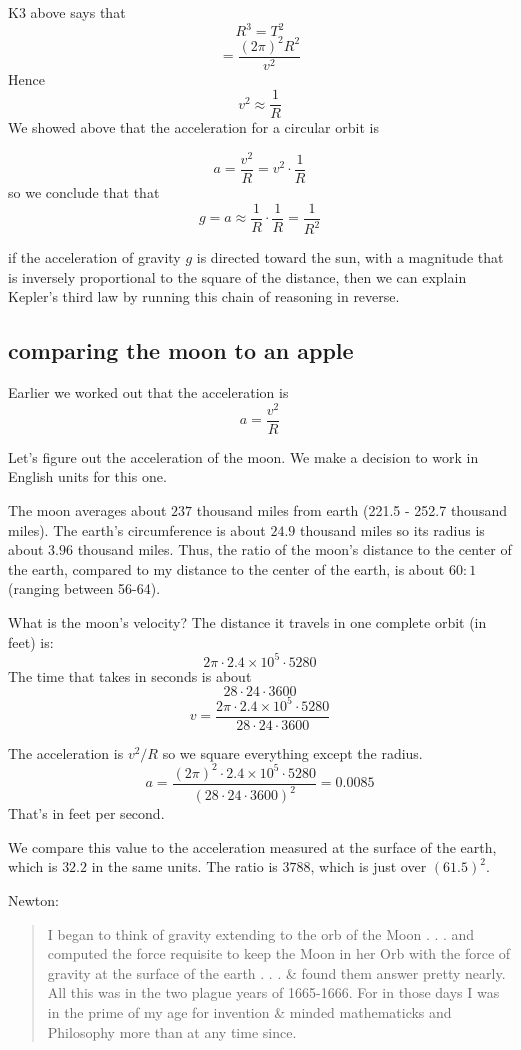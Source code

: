 \documentclass[11pt, oneside]{article}
\begin{document}
K3 above says that
\[ R^3 = T^2 \]
\[ = \frac{(2 \pi)^2 R^2}{v^2}  \]
Hence
\[ v^2 \approx \frac{1}{R} \]
We showed above that the acceleration for a circular orbit is

\[ a = \frac{v^2}{R} = v^2 \cdot \frac{1}{R}  \]
so we conclude that that
\[ g = a \approx \frac{1}{R} \cdot \frac{1}{R} = \frac{1}{R^2}  \] 

if the acceleration of gravity $g$ is directed toward the sun, with a magnitude that is inversely proportional to the square of the distance, then we can explain Kepler's third law by running this chain of reasoning in reverse.

\subsection*{comparing the moon to an apple}
Earlier we worked out that the acceleration is
\[ a = \frac{v^2}{R} \]

Let's figure out the acceleration of the moon.  We make a decision to work in English units for this one.  

The moon averages about $237$ thousand miles from earth (221.5 - 252.7 thousand miles).  The earth's circumference is about $24.9$ thousand miles so its radius is about $3.96$ thousand miles.  Thus, the ratio of the moon's distance to the center of the earth, compared to my distance to the center of the earth, is about $60:1$ (ranging between 56-64).

What is the moon's velocity?  The distance it travels in one complete orbit (in feet) is:
\[ 2 \pi \cdot 2.4 \times 10^5 \cdot 5280 \]
The time that takes in seconds is about
\[ 28 \cdot 24 \cdot 3600 \]
\[ v = \frac{2 \pi \cdot 2.4 \times 10^5 \cdot 5280}{28 \cdot 24 \cdot 3600} \]

The acceleration is $v^2/R$ so we square everything except the radius.
\[ a = \frac{(2 \pi)^2 \cdot 2.4 \times 10^5 \cdot 5280}{(28 \cdot 24 \cdot 3600)^2} = 0.0085 \]
That's in feet per second.

We compare this value to the acceleration measured at the surface of the earth, which is $32.2$ in the same units.  The ratio is $3788$, which is just over $(61.5)^2$.

Newton:

\begin{quote}I began to think of gravity extending to the orb of the Moon . . . and computed the force requisite to keep the Moon in her Orb with the force of gravity at the surface of the earth . . . \& found them answer pretty nearly. All this was in the two plague years of 1665-1666. For in those days I was in the prime of my age for invention \& minded mathematicks and Philosophy more than at any time since.\end{quote}
\end{document}

